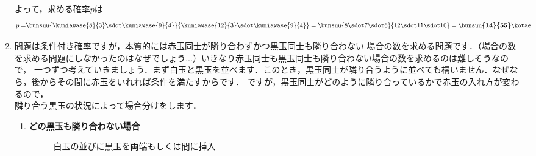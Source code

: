 \documentclass[../../../doc/main]{subfiles}
\begin{document}
\begin{enumerate}
            よって，求める確率$p$は
            \begin{align*}
            p=&\bunsuu{\kumiawase{8}{3}\sdot\kumiawase{9}{4}}{\kumiawase{12}{3}\sdot\kumiawase{9}{4}}=\bunsuu{8\sdot7\sdot6}{12\sdot11\sdot10}=\boldsymbol{\bunsuu{14}{55}}\kotae
            \end{align*}
        \item [\kakkoni]
            \textcolor{myBlue2}{問題は条件付き確率ですが，本質的には赤玉同士が隣り合わずかつ黒玉同士も隣り合わない
            場合の数を求める問題です．（場合の数を求める問題にしなかったのはなぜでしょう...）いきなり赤玉同士も黒玉同士も隣り合わない場合の数を求めるのは難しそうなので，
            一つずつ考えていきましょう．まず白玉と黒玉を並べます．このとき，黒玉同士が隣り合うように並べても構いません．なぜなら，後からその間に赤玉をいれれば条件を満たすからです．
            ですが，黒玉同士がどのように隣り合っているかで赤玉の入れ方が変わるので，} \\
            隣り合う黒玉の状況によって場合分けをします．
            \begin{enumerate}
                \item [\tokeiichi]
                    {\bf どの黒玉も隣り合わない場合} 

                    \begin{figure}[htbp]
                        \centering
                        \caption{白玉の並びに黒玉を両端もしくは間に挿入}
                        \label{白玉の並びに黒玉を両端もしくは間に挿入}
                    \end{figure}


\end{enumerate}
\end{enumerate}
\end{document}
